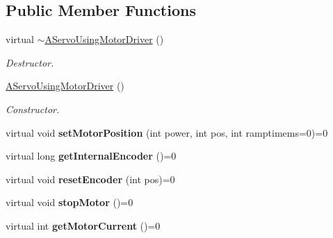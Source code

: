 \subsection*{Public Member Functions}
\begin{DoxyCompactItemize}
\item 
\mbox{\label{classAServoUsingMotorDriver_a67dd02e05e50e03eb4a343a296e90ee9}} 
virtual \hyperlink{classAServoUsingMotorDriver_a67dd02e05e50e03eb4a343a296e90ee9}{$\sim$\+A\+Servo\+Using\+Motor\+Driver} ()
\begin{DoxyCompactList}\small\item\em Destructor. \end{DoxyCompactList}\item 
\mbox{\label{classAServoUsingMotorDriver_a9ac0e6c8218b6c350dbae9588bac4530}} 
\hyperlink{classAServoUsingMotorDriver_a9ac0e6c8218b6c350dbae9588bac4530}{A\+Servo\+Using\+Motor\+Driver} ()
\begin{DoxyCompactList}\small\item\em Constructor. \end{DoxyCompactList}\item 
\mbox{\label{classAServoUsingMotorDriver_af6941fd146c15a133dd4d48d984d40d6}} 
virtual void {\bfseries set\+Motor\+Position} (int power, int pos, int ramptimems=0)=0
\item 
\mbox{\label{classAServoUsingMotorDriver_a5242ae7a1b345fa5380303494171aa2a}} 
virtual long {\bfseries get\+Internal\+Encoder} ()=0
\item 
\mbox{\label{classAServoUsingMotorDriver_ad310474c867cb26a2dac3bc9c232fe9c}} 
virtual void {\bfseries reset\+Encoder} (int pos)=0
\item 
\mbox{\label{classAServoUsingMotorDriver_a22bc07cd758253ac2a9ea3ec525f0615}} 
virtual void {\bfseries stop\+Motor} ()=0
\item 
\mbox{\label{classAServoUsingMotorDriver_a243c60ca22e5ed40ec66f0e93dd6d7c3}} 
virtual int {\bfseries get\+Motor\+Current} ()=0
\end{DoxyCompactItemize}
